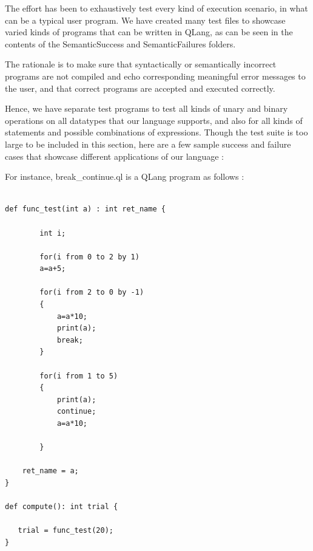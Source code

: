 The effort has been to exhaustively test every kind of execution scenario, in what can be a typical user program. We have created many test files to showcase varied kinds of programs that can be written in QLang, as can be seen in the contents of the SemanticSuccess and SemanticFailures folders.

The rationale is to make sure that syntactically or semantically incorrect programs are not compiled and echo corresponding meaningful error messages to the user, and that correct programs are accepted and executed correctly.

Hence, we have separate test programs to test all kinds of unary and binary operations on all datatypes that our language supports, and also for all kinds of statements and possible combinations of expressions. 
Though the test suite is too large to be included in this section, here are a few sample success and failure cases that showcase different applications of our language :


For instance, break\_continue.ql is a QLang program as follows :

\begin{lstlisting}

def func_test(int a) : int ret_name { 
        
        int i;

        for(i from 0 to 2 by 1)
        a=a+5;

        for(i from 2 to 0 by -1)
        {
            a=a*10;
            print(a);
            break;
        }

        for(i from 1 to 5)
        {
            print(a);
            continue;
            a=a*10;

        }

    ret_name = a;
}

def compute(): int trial {

   trial = func_test(20);
} 
\end{lstlisting}

